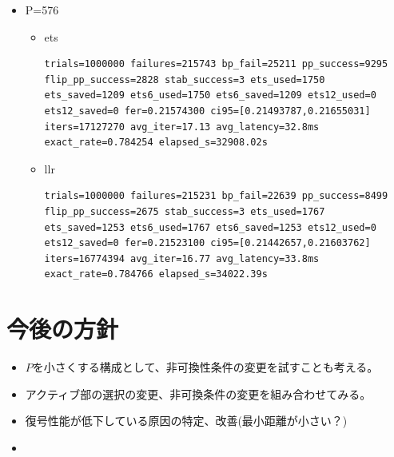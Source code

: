 \documentclass[a4paper,11pt,dvipdfmx]{jsarticle}
\theoremstyle{definition}
\begin{document}
\begin{itemize}
\begin{itemize}
        \item llr
        \begin{lstlisting}[breaklines=true, basicstyle=\ttfamily\small, frame=single, xleftmargin=2em]
trials=1000000 failures=240211 bp_fail=27116 pp_success=9586 flip_pp_success=3186 stab_success=4 ets_used=2172 ets_saved=1078 ets6_used=2160 ets6_saved=1078 ets12_used=0 ets12_saved=0 fer=0.24021100 ci95=[0.23937466,0.24104933] iters=17753203 avg_iter=17.75 avg_latency=41.2ms exact_rate=0.759785 elapsed_s=41419.92s
        \end{lstlisting}
    \end{itemize}
    \item P=576
    \begin{itemize}
        \item ets
        \begin{lstlisting}[breaklines=true, basicstyle=\ttfamily\small, frame=single, xleftmargin=2em]
trials=1000000 failures=215743 bp_fail=25211 pp_success=9295 flip_pp_success=2828 stab_success=3 ets_used=1750 ets_saved=1209 ets6_used=1750 ets6_saved=1209 ets12_used=0 ets12_saved=0 fer=0.21574300 ci95=[0.21493787,0.21655031] iters=17127270 avg_iter=17.13 avg_latency=32.8ms exact_rate=0.784254 elapsed_s=32908.02s
        \end{lstlisting}
        
        \item llr
        \begin{lstlisting}[breaklines=true, basicstyle=\ttfamily\small, frame=single, xleftmargin=2em]
trials=1000000 failures=215231 bp_fail=22639 pp_success=8499 flip_pp_success=2675 stab_success=3 ets_used=1767 ets_saved=1253 ets6_used=1767 ets6_saved=1253 ets12_used=0 ets12_saved=0 fer=0.21523100 ci95=[0.21442657,0.21603762] iters=16774394 avg_iter=16.77 avg_latency=33.8ms exact_rate=0.784766 elapsed_s=34022.39s
        \end{lstlisting}
    \end{itemize}
\end{itemize}

\section{今後の方針}
\begin{itemize}
  \item $P$を小さくする構成として、非可換性条件の変更を試すことも考える。
  \item アクティブ部の選択の変更、非可換条件の変更を組み合わせてみる。
  \item 復号性能が低下している原因の特定、改善(最小距離が小さい？)
  \item 
\end{itemize}
\end{document}
